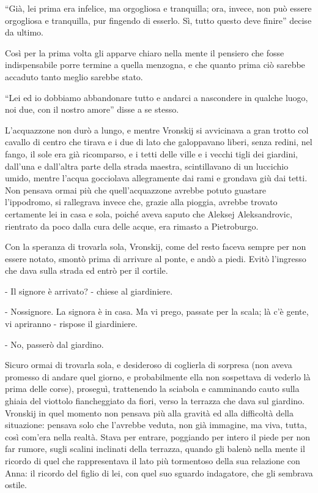 ``Già, lei prima era infelice, ma orgogliosa e tranquilla; ora, invece, non può essere orgogliosa e tranquilla, pur fingendo di esserlo. Sì, tutto questo deve finire'' decise da ultimo. 

Così per la prima volta gli apparve chiaro nella mente il pensiero che fosse indispensabile porre termine a quella menzogna, e che quanto prima ciò sarebbe accaduto tanto meglio sarebbe stato. 

``Lei ed io dobbiamo abbandonare tutto e andarci a nascondere in qualche luogo, noi due, con il nostro amore'' disse a se stesso. 

\label{xxii-1} 

L'acquazzone non durò a lungo, e mentre Vronskij si avvicinava a gran trotto col cavallo di centro che tirava e i due di lato che galoppavano liberi, senza redini, nel fango, il sole era già ricomparso, e i tetti delle ville e i vecchi tigli dei giardini, dall'una e dall'altra parte della strada maestra, scintillavano di un luccichio umido, mentre l'acqua gocciolava allegramente dai rami e grondava giù dai tetti. Non pensava ormai più che quell'acquazzone avrebbe potuto guastare l'ippodromo, si rallegrava invece che, grazie alla pioggia, avrebbe trovato certamente lei in casa e sola, poiché aveva saputo che Aleksej Aleksandrovic, rientrato da poco dalla cura delle acque, era rimasto a Pietroburgo. 

Con la speranza di trovarla sola, Vronskij, come del resto faceva sempre per non essere notato, smontò prima di arrivare al ponte, e andò a piedi. Evitò l'ingresso che dava sulla strada ed entrò per il cortile. 

- Il signore è arrivato? - chiese al giardiniere. 

- Nossignore. La signora è in casa. Ma vi prego, passate per la scala; là c'è gente, vi apriranno - rispose il giardiniere. 

- No, passerò dal giardino. 

Sicuro ormai di trovarla sola, e desideroso di coglierla di sorpresa (non aveva promesso di andare quel giorno, e probabilmente ella non sospettava di vederlo là prima delle corse), proseguì, trattenendo la sciabola e camminando cauto sulla ghiaia del viottolo fiancheggiato da fiori, verso la terrazza che dava sul giardino. Vronskij in quel momento non pensava più alla gravità ed alla difficoltà della situazione: pensava solo che l'avrebbe veduta, non già immagine, ma viva, tutta, così com'era nella realtà. Stava per entrare, poggiando per intero il piede per non far rumore, sugli scalini inclinati della terrazza, quando gli balenò nella mente il ricordo di quel che rappresentava il lato più tormentoso della sua relazione con Anna: il ricordo del figlio di lei, con quel suo sguardo indagatore, che gli sembrava ostile. 

